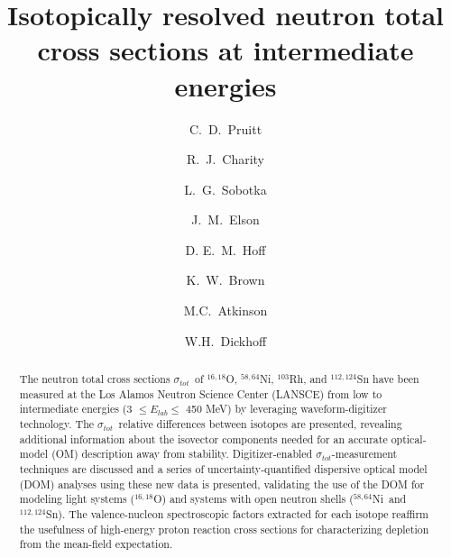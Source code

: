 \documentclass[twocolumn,secnumarabic,amssymb, nobibnotes, aps, prl,
superscriptaddress, nobalancelastpage, floatfix]{revtex4}
\newcommand{\tot}{\ensuremath{\sigma_{tot}}}
\newcommand{\oSixEight}{\ensuremath{^{16,18}}O}
\newcommand{\niEightFour}{\ensuremath{^{58,64}}N\lowercase{i}}
\newcommand{\snTwelveFour}{\ensuremath{^{112,124}}S\lowercase{n}}
\begin{document}
\begin{abstract}
    The neutron total cross sections \tot\ of $^{16,18}$O,
    $^{58,64}$Ni, $^{103}$Rh, and $^{112,124}$Sn have been measured at the Los Alamos
    Neutron Science Center (LANSCE) from low to intermediate energies (3 $\leq E_{lab}
    \leq$ 450 MeV) by
    leveraging waveform-digitizer technology. The \tot\ relative differences between
    isotopes are presented, revealing additional information about
    the isovector components needed for an accurate optical-model (OM)
    description away from stability. Digitizer-enabled \tot-measurement
    techniques are discussed and a series of uncertainty-quantified dispersive optical model (DOM)
    analyses using these new data is presented, validating the use of the DOM for modeling light
    systems (\oSixEight) and systems with open neutron shells (\niEightFour\ and \snTwelveFour).
    The valence-nucleon spectroscopic factors extracted for each isotope reaffirm the usefulness of
    high-energy proton reaction cross sections for characterizing depletion from the mean-field
    expectation.
    \end{abstract}

\title{Isotopically resolved neutron total cross sections at
intermediate energies}

\author{C.~D.~Pruitt}  
\author{R.~J.~Charity}
\author{L.~G.~Sobotka}
\author{J.~M.~Elson}
\author{D. E.~M.~Hoff}  
\author{K.~W.~Brown}
\author{M.C.~Atkinson}
\author{W.H.~Dickhoff}
\end{document}
